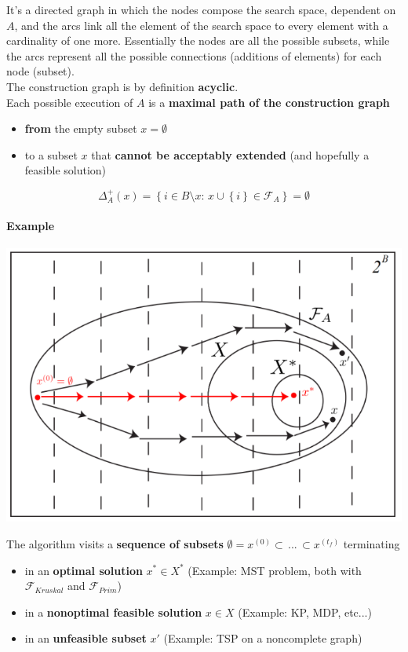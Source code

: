 It's a directed graph in which the nodes compose the search space, dependent on $A$, and the arcs link all the element of the search space to every element with a cardinality of one more. Essentially the nodes are all the possible subsets, while the arcs represent all the possible connections (additions of elements) for each node (subset).\\

The construction graph is by definition \textbf{acyclic}.\\

Each possible execution of $A$ is a \textbf{maximal path of the construction graph}
\begin{itemize}
	\item \textbf{from} the empty subset $x = \emptyset$
	\item to a subset $x$ that \textbf{cannot be acceptably extended} (and hopefully a feasible solution)
\end{itemize}
$$ \Delta^+_A (x) = \left\{i \in B \setminus x : \, x \cup \left\{i\right\} \in \mathcal{F}_A \right\} = \emptyset $$

\newpage

\paragraph{Example}
\begin{center}
	\includegraphics[width=0.8\columnwidth]{img/CGraph1}
\end{center}
The algorithm visits a \textbf{sequence of subsets} $\emptyset = x^{(0)} \subset \, ... \, \subset x^{(t_f)}$ terminating
\begin{itemize}
	\item in an \textbf{optimal solution} $x^\ast \in X^\ast$ (Example: MST problem, both with $\mathcal{F}_{Kruskal}$ and $\mathcal{F}_{Prim}$)
	\item in a \textbf{nonoptimal feasible solution} $x \in X$ (Example: KP, MDP, etc...)
	\item in an \textbf{unfeasible subset} $x'$ (Example: TSP on a noncomplete graph)
\end{itemize}

